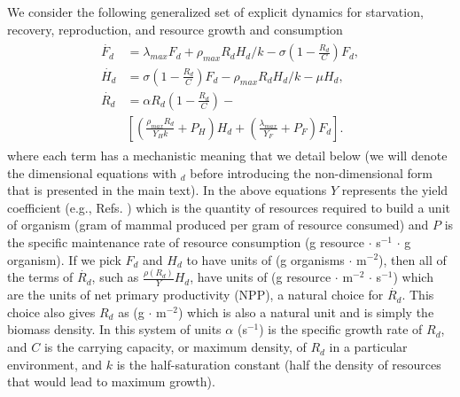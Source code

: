 \documentclass[twocolumn,preprintnumbers,amsmath,amssymb,superscriptaddress]{revtex4}
\begin{document}
\begin{bibunit}[unsrt]
We consider the following generalized set of explicit dynamics for starvation, recovery, reproduction, and resource growth and consumption
\begin{align}
\begin{split}
\dot{F_{d}} &= \lambda_{max} F_{d} + \rho_{max}R_{d}H_{d}/k - \sigma \left(1-\frac{R_{d}}{C}\right)F_{d},  \\
\dot{H_{d}} &= \sigma \left(1-\frac{R_{d}}{C}\right)F_{d} - \rho_{max}R_{d} H_{d}/k - \mu H_{d},  \\
\dot{R_{d}} &= \alpha R_{d}\left(1-\frac{R_{d}}{C}\right) -\\
& \left[\left(\frac{\rho_{max}R_{d}}{Y_{H}k}+P_{H}\right)H_{d}+\left(\frac{\lambda_{max}}{Y_{F}}+P_{F}\right)F_{d}\right].
\end{split}
\end{align}
where each term has a mechanistic meaning that we detail below (we will denote the dimensional equations with $_{d}$ before introducing the non-dimensional form that is presented in the main text). In the above equations $Y$ represents the yield coefficient (e.g., Refs. \citep{pirt,Heijnen}) which is the quantity of resources required to build a unit of organism (gram of mammal produced per gram of resource consumed) and $P$ is the specific maintenance rate of resource consumption (g resource $\cdot$ s$^{-1}$ $\cdot$ g organism). If we pick $F_{d}$ and $H_{d}$ to have units of (g organisms $\cdot$ m$^{-2}$), then all of the terms of $\dot{R_{d}}$, such as $\frac{\rho\left(R_{d}\right)}{Y}H_{d}$, have units of (g resource $\cdot$ m$^{-2}$ $\cdot$ s$^{-1}$) which are the units of net primary productivity (NPP), a natural choice for $\dot{R_{d}}$. This choice also gives $R_{d}$ as (g $\cdot$ m$^{-2}$) which is also a natural unit and is simply the biomass density. In this system of units $\alpha$ (s$^{-1}$) is the specific growth rate of $R_{d}$, and $C$ is the carrying capacity, or maximum density, of $R_{d}$ in a particular environment, and $k$ is the half-saturation constant (half the density of resources that would lead to maximum growth).





\end{bibunit}
\end{document}
